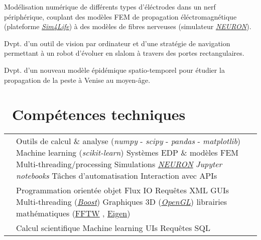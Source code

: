 \documentclass[a4paper]{cv}
\begin{document}
\begin{minipage}[t]{0.6\textwidth}
Modélisation numérique de différents types d'éléctrodes dans un nerf périphérique, couplant des modèles FEM de propagation éléctromagnétique (plateforme \href{http://www.zurichmedtech.com/sim4life/}{\emph{Sim4Life}}) à des modèles de fibres nerveuses (simulateur \href{https://neuron.yale.edu/neuron/}{\emph{NEURON}}).
\sectionspace

Dvpt. d'un outil de vision par ordinateur et d'une stratégie de navigation permettant à un robot d'évoluer en slalom à travers des portes rectangulaires.
\sectionspace

Dvpt. d'un nouveau modèle épidémique spatio-temporel pour étudier la propagation de la peste à Venise au moyen-âge. 
\sectionspace

\section{\texorpdfstring{\faWrench}\ \ Compétences techniques}\sectionline

\def\arraystretch{1.5}
\begin{tabular}{R{0.21\textwidth} L{0.7\textwidth}}

 & Outils de calcul \& analyse (\emph{numpy} - \emph{scipy} - \emph{pandas} - \emph{matplotlib}) \tbl{} Machine learning (\emph{scikit-learn}) \tbl{} Systèmes EDP \& modèles FEM \tbl{} Multi-threading/processing \tbl{} Simulations \href{https://neuron.yale.edu/neuron/}{\emph{NEURON}} \tbl{} \emph{Jupyter notebooks} \tbl{} Tâches d'automatisation \tbl{}Interaction avec APIs\\

 & Programmation orientée objet \tbl{} Flux IO \tbl{} Requêtes XML \tbl{} GUIs \tbl{} Multi-threading (\href{https://www.boost.org/}{\emph{Boost}}) \tbl{} Graphiques 3D (\href{https://www.opengl.org/}{\emph{OpenGL}}) \tbl{} librairies mathématiques (\href{http://fftw.org/}{FFTW} , \href{http://eigen.tuxfamily.org/index.php?title=Main_Page}{Eigen})\\

 & Calcul scientifique \tbl{} Machine learning \tbl{} UIs \tbl{} Requêtes SQL\\


\end{tabular}
\end{minipage}
\end{document}
